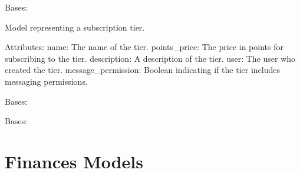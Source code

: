 \documentclass[letterpaper,10pt,english]{sphinxmanual}
\begin{document}
\begin{fulllineitems}
\label{\detokenize{modules/models:creator.models.Tier}}
\pysigstartsignatures
{}
\pysigstopsignatures
\sphinxAtStartPar
Bases: 

\sphinxAtStartPar
Model representing a subscription tier.

\sphinxAtStartPar
Attributes:
\sphinxhyphen{} name: The name of the tier.
\sphinxhyphen{} points\_price: The price in points for subscribing to the tier.
\sphinxhyphen{} description: A description of the tier.
\sphinxhyphen{} user: The user who created the tier.
\sphinxhyphen{} message\_permission: Boolean indicating if the tier includes messaging permissions.

\begin{fulllineitems}
\label{\detokenize{modules/models:creator.models.Tier.DoesNotExist}}
\pysigstartsignatures
{}
\pysigstopsignatures
\sphinxAtStartPar
Bases: 

\end{fulllineitems}


\begin{fulllineitems}
\label{\detokenize{modules/models:creator.models.Tier.MultipleObjectsReturned}}
\pysigstartsignatures
{}
\pysigstopsignatures
\sphinxAtStartPar
Bases: 

\end{fulllineitems}


\end{fulllineitems}



\section{Finances Models}
\label{\detokenize{modules/models:module-finances.models}}\label{\detokenize{modules/models:finances-models}}
\end{document}
